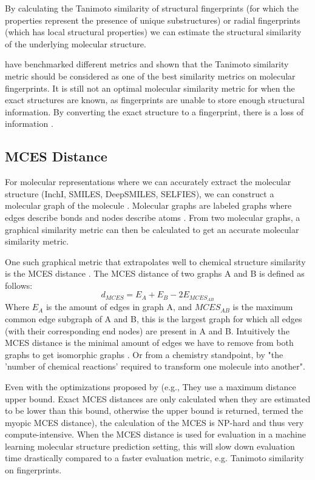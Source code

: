 By calculating the Tanimoto similarity of structural fingerprints (for which the properties represent the presence of unique substructures) or radial fingerprints (which has local structural properties) we can estimate the structural similarity of the underlying molecular structure.

\textcite{bajusz2015tanimoto} have benchmarked different metrics and shown that the Tanimoto similarity metric should be considered as one of the best similarity metrics on molecular fingerprints. It is still not an optimal molecular similarity metric for when the exact structures are known, as fingerprints are unable to store enough structural information. By converting the exact structure to a fingerprint, there is a loss of information \cite{kretschmer2023small}.

\subsection{MCES Distance}
\label{sec:mces_dist}

For molecular representations where we can accurately extract the molecular structure (InchI, SMILES, DeepSMILES, SELFIES), we can construct a molecular graph of the molecule \cite{wigh2022review}. Molecular graphs are labeled graphs where edges describe bonds and nodes describe atoms \cite{kretschmer2023small}. From two molecular graphs, a graphical similarity metric can then be calculated to get an accurate molecular similarity metric. 

One such graphical metric that extrapolates well to chemical structure similarity is the \ac{MCES} distance \cite{kretschmer2023small}. The MCES distance of two graphs A and B is defined as follows:
\[d_{MCES} = E_A + E_B - 2E_{MCES_{AB}}\]
Where $E_A$ is the amount of edges in graph A, and $MCES_{AB}$ is the maximum common edge subgraph of A and B, this is the largest graph for which all edges (with their corresponding end nodes) are present in A and B. Intuitively the MCES distance is the minimal amount of edges we have to remove from both graphs to get isomorphic graphs \cite{kretschmer2023small}. Or from a chemistry standpoint, by \textcite{kretschmer2023small} "the 'number of chemical reactions' required to transform one molecule into another".

Even with the optimizations proposed by \textcite{kretschmer2023small}
(e.g., They use a maximum distance upper bound.
Exact MCES distances are only calculated when they are estimated to be lower than this bound,
otherwise the upper bound is returned, termed the myopic MCES distance),
the calculation of the MCES is NP-hard and thus very compute-intensive.
When the MCES distance is used for evaluation in a machine learning molecular structure prediction setting,
this will slow down evaluation time drastically compared to a faster evaluation metric, e.g. Tanimoto similarity on fingerprints.

